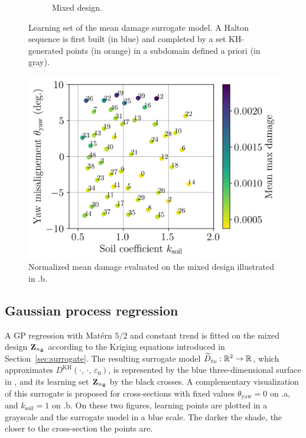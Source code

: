 \begin{figure}
\begin{subfigure}{0.48\linewidth}
        \caption{Mixed design.}
    \end{subfigure}
    \caption{Learning set of the mean damage surrogate model. A Halton sequence is first built (in blue) and completed by a set KH-generated points (in orange) in a subdomain defined a priori (in gray).}
    \label{fig:initial_doe}
\end{figure}

\begin{figure}[h!]
    \centering
    \includegraphics[width=0.6\linewidth]{./part3/figures/OWT/normalized_results_mean.png}
    \caption{Normalized mean damage evaluated on the mixed design illustrated in .b.}
    \label{fig:evaluated_doe}
\end{figure}


\subsection{Gaussian process regression}\label{sec:gp_owt}
A GP regression with Matérn $5/2$ and constant trend is fitted on the mixed design ${\bf Z}_{n_{\bf Z}}$ according to the Kriging equations introduced in Section~\ref{sec:surrogate}. 
The resulting surrogate model $\widetilde{D}_{\varepsilon_0}:\mathbb{R}^2 \rightarrow \mathbb{R}$, which approximates $D^{\mathrm{KH}}(\cdot, \, \cdot, \, \varepsilon_0)$, is represented by the blue three-dimensional surface in , and its learning set  ${\bf Z}_{n_{\bf Z}}$ by the black crosses.  
A complementary visualization of this surrogate is proposed for cross-sections with fixed values $\theta_{\mathrm{yaw}}=0$ on .a, and $k_{\mathrm{soil}}=1$ on .b. 
On these two figures, learning points are plotted in a grayscale and the surrogate model in a blue scale. 
The darker the shade, the closer to the cross-section the points are. 

